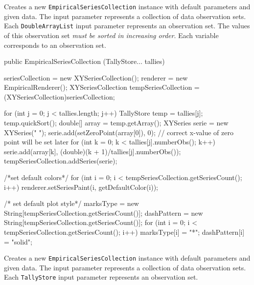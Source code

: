 \begin{tabb}
   Creates a new \texttt{EmpiricalSeriesCollection} instance with default
parameters and given data.
 The input parameter represents a collection of data observation sets.
 Each \texttt{Double\-Array\-List}
   input parameter represents an observation set. The values of this
   observation set \textit{must be sorted in increasing order}.
   Each  variable corresponds
  to an observation set.
\end{tabb}
\begin{htmlonly}
\end{htmlonly}
\begin{code}

   public EmpiricalSeriesCollection (TallyStore... tallies) \begin{hide} {
      seriesCollection = new XYSeriesCollection();
      renderer = new EmpiricalRenderer();
      XYSeriesCollection tempSeriesCollection = (XYSeriesCollection)seriesCollection;

      for (int j = 0; j < tallies.length; j++) {
         TallyStore temp = tallies[j];
         temp.quickSort();
         double[] array = temp.getArray();
         XYSeries serie = new XYSeries(" ");
         serie.add(setZeroPoint(array[0]), 0); // correct x-value of zero point will be set later
         for (int k = 0; k < tallies[j].numberObs(); k++)
            serie.add(array[k], (double)(k + 1)/tallies[j].numberObs());
         tempSeriesCollection.addSeries(serie);
      }

      /*set default colors*/
      for (int i = 0; i < tempSeriesCollection.getSeriesCount(); i++) {
         renderer.setSeriesPaint(i, getDefaultColor(i));
      }

      /* set default plot style*/
      marksType = new String[tempSeriesCollection.getSeriesCount()];
      dashPattern = new String[tempSeriesCollection.getSeriesCount()];
      for (int i = 0; i < tempSeriesCollection.getSeriesCount(); i++) {
         marksType[i] = "*";
         dashPattern[i] = "solid";
      }
   }\end{hide}
\end{code}
\begin{tabb}
  Creates a new \texttt{EmpiricalSeriesCollection} instance with default
  parameters and given data. The input parameter represents a collection of data
  observation sets. Each \texttt{TallyStore} input parameter represents an
  observation set.
\end{tabb}
